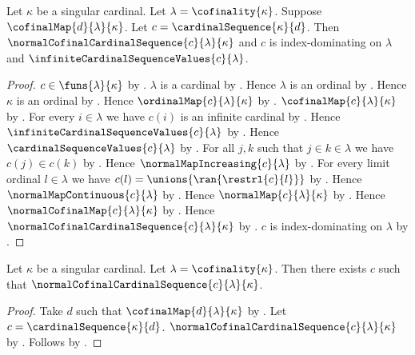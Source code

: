 \begin{theorem}\label{cardinal_sequence_is_normal_cofinal}
    Let $\kappa$ be a singular cardinal.
    Let $\lambda=\cofinality{\kappa}$.
    Suppose $\cofinalMap{d}{\lambda}{\kappa}$.
    Let $c=\cardinalSequence{\kappa}{d}$.
    Then $\normalCofinalCardinalSequence{c}{\lambda}{\kappa}$ and
        $c$ is index-dominating on $\lambda$ and
        $\infiniteCardinalSequenceValues{c}{\lambda}$.
\end{theorem}
\begin{proof}
    $c\in\funs{\lambda}{\kappa}$ by .
    $\lambda$ is a cardinal by .
    Hence $\lambda$ is an ordinal by .
    Hence $\kappa$ is an ordinal by .
    Hence $\ordinalMap{c}{\lambda}{\kappa}$ by .
    $\cofinalMap{c}{\lambda}{\kappa}$
        by .
    For every $i\in\lambda$ we have $c(i)$ is an infinite cardinal
        by .
    Hence $\infiniteCardinalSequenceValues{c}{\lambda}$
        by .
    Hence $\cardinalSequenceValues{c}{\lambda}$
        by .
    For all $j,k$ such that $j\in k\in\lambda$ we have $c(j)\in c(k)$
        by .
    Hence $\normalMapIncreasing{c}{\lambda}$
        by .
    For every limit ordinal $l\in\lambda$ we have
        $c(l)=\unions{\ran{\restrl{c}{l}}}$
        by .
    Hence $\normalMapContinuous{c}{\lambda}$
        by .
    Hence $\normalMap{c}{\lambda}{\kappa}$ by .
    Hence $\normalCofinalMap{c}{\lambda}{\kappa}$
        by .
    Hence $\normalCofinalCardinalSequence{c}{\lambda}{\kappa}$
        by .
    $c$ is index-dominating on $\lambda$
        by .
\end{proof}

\begin{theorem}\label{normal_cofinal_cardinal_sequence_exists}
    Let $\kappa$ be a singular cardinal.
    Let $\lambda=\cofinality{\kappa}$.
    Then there exists $c$ such that
        $\normalCofinalCardinalSequence{c}{\lambda}{\kappa}$.
\end{theorem}
\begin{proof}
    Take $d$ such that $\cofinalMap{d}{\lambda}{\kappa}$
        by .
    Let $c=\cardinalSequence{\kappa}{d}$.
    $\normalCofinalCardinalSequence{c}{\lambda}{\kappa}$
        by .
    Follows by \auto.
\end{proof}

